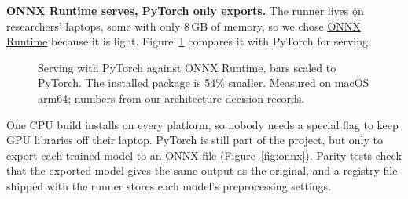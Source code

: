 \documentclass[11pt,a4paper]{article}
\newcommand{\choice}[1]{\par\smallskip\textbf{#1}\enspace}
\begin{document}
\choice{ONNX Runtime serves, PyTorch only exports.} The runner lives on researchers' laptops, some with only 8\,GB of memory, so we chose \href{https://onnxruntime.ai}{ONNX Runtime} because it is light. Figure~\ref{fig:onnxbars} compares it with PyTorch for serving.

\begin{figure}[!ht]
\centering
{}
\caption{Serving with PyTorch against ONNX Runtime, bars scaled to PyTorch. The installed package is 54\% smaller. Measured on macOS arm64; numbers from our architecture decision records.}
\label{fig:onnxbars}
\end{figure}

One CPU build installs on every platform, so nobody needs a special flag to keep GPU libraries off their laptop. PyTorch is still part of the project, but only to export each trained model to an ONNX file (Figure~\ref{fig:onnx}). Parity tests check that the exported model gives the same output as the original, and a registry file shipped with the runner stores each model's preprocessing settings.
\end{document}
